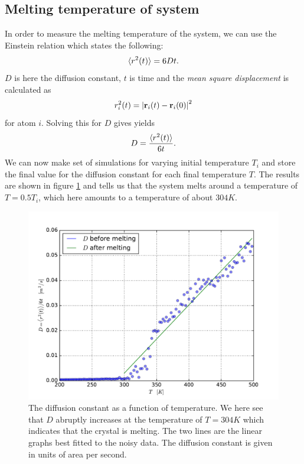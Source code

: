 \documentclass[a4paper]{article}
\renewcommand{\vec}[1]{\mathbf{#1}}
\begin{document}
\subsection{Melting temperature of system}
\label{sub:melting_temperature_of_system}

    In order to measure the melting temperature of the system, we can use the
    Einstein relation which states the following:
    \begin{equation}
        \notag
        \langle r^2(t) \rangle = 6Dt.
    \end{equation}
    $D$ is here the diffusion constant, $t$ is time and the \emph{mean square
    displacement} is calculated as
    \begin{equation}
        \notag
        r_i^2(t) = \left| \vec{r}_i(t) - \vec{r}_i(0) \right|^2
    \end{equation}
    for atom $i$. Solving this for $D$ gives yields
    \begin{equation}
        \notag
        D = \frac{\langle r^2(t) \rangle}{6t}.
    \end{equation}
    We can now make set of simulations for varying initial temperature $T_i$
    and store the final value for the diffusion constant for each final
    temperature $T$. The results are shown in figure
    \ref{fig:diffusion_constant} and tells us that the system melts around a
    temperature of $T = 0.5T_i$, which here amounts to a temperature of about
    $304K$.
    
    \begin{figure}[h]
        \centering \includegraphics[width=0.8\linewidth]{diffusion_constant.pdf}
        \caption[Diffusion constant]{The diffusion constant as a function of
            temperature. We here see that $D$ abruptly increases at the
            temperature of $T = 304K$ which indicates that the crystal is
        melting. The two lines are the linear graphs best fitted to the noisy
    data.  The diffusion constant is given in units of area per second.}
        \label{fig:diffusion_constant}
    \end{figure}
\clearpage
\end{document}
